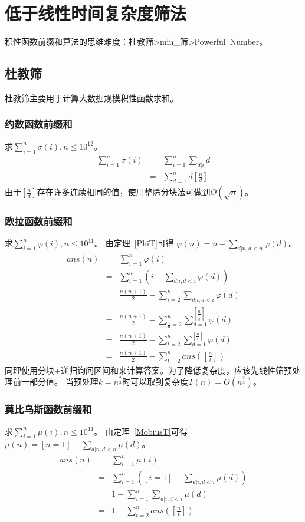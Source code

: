 \section{低于线性时间复杂度筛法}
积性函数前缀和算法的思维难度：杜教筛>min\_筛>Powerful~Number。
\subsection{杜教筛}
杜教筛主要用于计算大数据规模积性函数求和。
\subsubsection{约数函数前缀和}
求$\displaystyle \sum_{i=1}^n{\sigma(i)},n\leq 10^{12}$。
\begin{eqnarray*}
    \sum_{i=1}^n{\sigma(i)}&=&\sum_{i=1}^n{\sum_{d|i}d}\\
    &=&\sum_{d=1}^n{d[\frac{n}{d}]}
\end{eqnarray*}
由于$[\frac{n}{d}]$存在许多连续相同的值，使用整除分块法可做到$O(\sqrt{n})$。
\subsubsection{欧拉函数前缀和}
求$\displaystyle \sum_{i=1}^n{\varphi(i)},n\leq 10^{11}$。
由定理~\ref{PhiT}可得
$\displaystyle \varphi(n)=n-\sum_{d|n,d<n}{\varphi(d)}$。
\begin{eqnarray*}
    ans(n)&=&\sum_{i=1}^n{\varphi(i)}\\
    &=&\sum_{i=1}^n{\left(i-\sum_{d|i,d<i}{\varphi(d)}\right)}\\
    &=&\frac{n(n+1)}{2}-\sum_{i=2}^{n}{\sum_{d|i,d<i}{\varphi(d)}}\\
    &=&\frac{n(n+1)}{2}-\sum_{\frac{i}{d}=2}^n
    {\sum_{d=1}^{[\frac{n}{\frac{i}{d}}]}{\varphi(d)}}\\
    &=&\frac{n(n+1)}{2}-\sum_{t=2}^n
    {\sum_{d=1}^{[\frac{n}{t}]}{\varphi(d)}}\\
    &=&\frac{n(n+1)}{2}-\sum_{t=2}^n{ans([\frac{n}{t}])}
\end{eqnarray*}
同理使用分块+递归询问区间和来计算答案。为了降低复杂度，应该先线性筛预处理前一部分值。
当预处理$k=n^\frac{2}{3}$时可以取到复杂度$T(n)=O(n^\frac{2}{3})$。
\subsubsection{莫比乌斯函数前缀和}
求$\displaystyle \sum_{i=1}^n{\mu(i)},n\leq 10^{11}$。
由定理~\ref{MobiusT}可得
$\displaystyle \mu(n)=[n=1]-\sum_{d|n,d<n}{\mu(d)}$。
\begin{eqnarray*}
    ans(n)&=&\sum_{i=1}^n{\mu(i)}\\
    &=&\sum_{i=1}^n{\left([i=1]-\sum_{d|i,d<i}{\mu(d)}\right)}\\
    &=&1-\sum_{i=1}^n{\sum_{d|i,d<i}{\mu(d)}}\\
    &=&1-\sum_{t=2}^n{ans([\frac{n}{t}])}
\end{eqnarray*}
